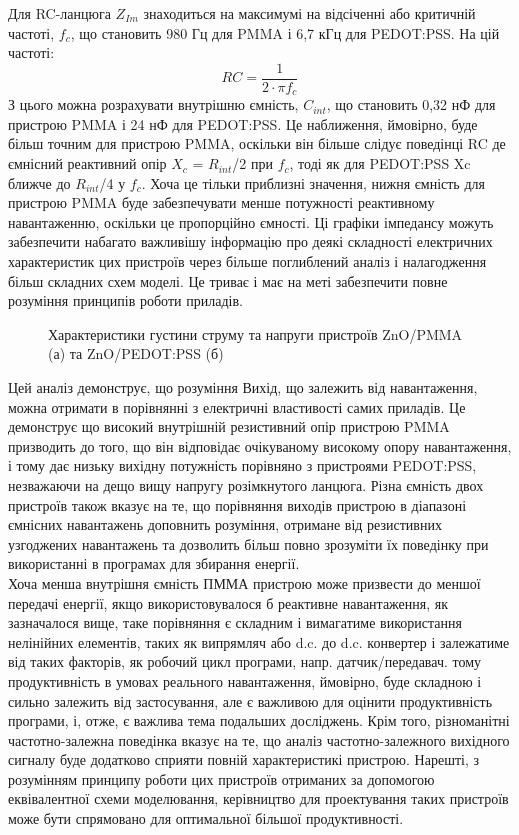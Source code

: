 \documentclass[a4paper,14pt]{extreport}
\begin{document}
Для RC-ланцюга $Z_{Im}$ знаходиться на максимумі на відсіченні або критичній
частоті, $f_c$, що становить 980 Гц для PMMA і 6,7 кГц для
PEDOT:PSS. На цій частоті:
\[ RC = \dfrac{1}{2\cdot \pi f_{c}}\]
З цього можна розрахувати внутрішню ємність,
$C_{int}$, що становить 0,32 нФ для пристрою PMMA і 24 нФ для
PEDOT:PSS. Це наближення, ймовірно, буде більш точним
для пристрою PMMA, оскільки він більше слідує поведінці RC
де ємнісний реактивний опір $X_{c}$ = $R_{int}$/2 при $f_c$, тоді як для
PEDOT:PSS Xc ближче до $R_{int}$/4 у $f_c$. Хоча це тільки
приблизні значення, нижня ємність для пристрою PMMA
буде забезпечувати менше потужності реактивному навантаженню, оскільки це пропорційно ємності. Ці графіки імпедансу можуть забезпечити
набагато важливішу інформацію про деякі складності
електричних характеристик цих пристроїв через більше
поглиблений аналіз і налагодження більш складних схем моделі.
Це триває і має на меті забезпечити повне розуміння
принципів роботи приладів. \\ 

\begin{figure}[h!]
\caption{\small{Характеристики густини струму та напруги пристроїв ZnO/PMMA (а) та ZnO/PEDOT:PSS (б)}}
\end{figure}

Цей аналіз демонструє, що розуміння
Вихід, що залежить від навантаження, можна отримати в порівнянні з
електричні властивості самих приладів. Це демонструє
що високий внутрішній резистивний опір пристрою PMMA
призводить до того, що він відповідає очікуваному високому опору навантаження, і
тому дає низьку вихідну потужність порівняно з
пристроями PEDOT:PSS, незважаючи на дещо вищу напругу розімкнутого ланцюга.
Різна ємність двох пристроїв також вказує на те, що 
порівняння виходів пристрою в діапазоні ємнісних
навантажень доповнить розуміння, отримане від резистивних
узгоджених навантажень та дозволить більш повно зрозуміти
їх поведінку при використанні в програмах для збирання енергії.\\ 

Хоча менша внутрішня ємність ПММА пристрою
може призвести до меншої передачі енергії, якщо використовувалося б реактивне навантаження, як зазначалося вище, таке порівняння є складним і
вимагатиме використання нелінійних елементів, таких як випрямляч або
d.c. до d.c. конвертер і залежатиме від таких факторів, як
робочий цикл програми, напр. датчик/передавач. тому
продуктивність в умовах реального навантаження, ймовірно, буде складною і сильно залежить від застосування, але є важливою для
оцінити продуктивність програми, і, отже, є
важлива тема подальших досліджень. Крім того, різноманітні
частотно-залежна поведінка вказує на те, що аналіз частотно-залежного вихідного сигналу буде додатково сприяти повній характеристикі пристрою. Нарешті, з розумінням принципу роботи цих пристроїв отриманих за допомогою еквівалентної схеми
моделювання, керівництво для проектування таких пристроїв може бути спрямовано
для оптимальної більшої продуктивності.
\end{document}
